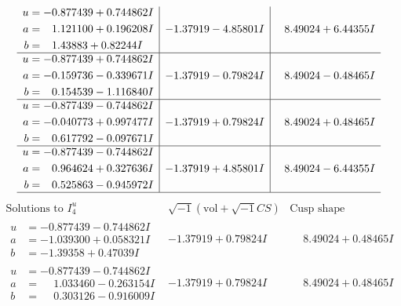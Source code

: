 \documentclass[1p]{elsarticle_modified}
\theoremstyle{definition}
\newcommand{\I}{\sqrt{-1}}
\begin{document}
$$\begin{array}{c|c|c}
\begin{aligned}
u &= -0.877439 + 0.744862 I \\
a &= \phantom{-}1.121100 + 0.196208 I \\
b &= \phantom{-}1.43883 + 0.82244 I\end{aligned}
 & -1.37919 - 4.85801 I & \phantom{-}8.49024 + 6.44355 I \\ \hline\begin{aligned}
u &= -0.877439 + 0.744862 I \\
a &= -0.159736 - 0.339671 I \\
b &= \phantom{-}0.154539 - 1.116840 I\end{aligned}
 & -1.37919 - 0.79824 I & \phantom{-}8.49024 - 0.48465 I \\ \hline\begin{aligned}
u &= -0.877439 - 0.744862 I \\
a &= -0.040773 + 0.997477 I \\
b &= \phantom{-}0.617792 - 0.097671 I\end{aligned}
 & -1.37919 + 0.79824 I & \phantom{-}8.49024 + 0.48465 I \\ \hline\begin{aligned}
u &= -0.877439 - 0.744862 I \\
a &= \phantom{-}0.964624 + 0.327636 I \\
b &= \phantom{-}0.525863 - 0.945972 I\end{aligned}
 & -1.37919 + 4.85801 I & \phantom{-}8.49024 - 6.44355 I\\
 \hline 
 \end{array}$$\newpage$$\begin{array}{c|c|c}  
\text{Solutions to }I^u_{4}& \I (\text{vol} + \sqrt{-1}CS) & \text{Cusp shape}\\
 \hline 
\begin{aligned}
u &= -0.877439 - 0.744862 I \\
a &= -1.039300 + 0.058321 I \\
b &= -1.39358 + 0.47039 I\end{aligned}
 & -1.37919 + 0.79824 I & \phantom{-}8.49024 + 0.48465 I \\ \hline\begin{aligned}
u &= -0.877439 - 0.744862 I \\
a &= \phantom{-}1.033460 - 0.263154 I \\
b &= \phantom{-}0.303126 - 0.916009 I\end{aligned}
 & -1.37919 + 0.79824 I & \phantom{-}8.49024 + 0.48465 I \\ \hline\begin{aligned}

\end{aligned}
\end{array}$$
\end{document}
